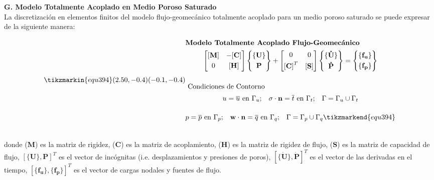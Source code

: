 \textbf{G. Modelo Totalmente Acoplado en Medio Poroso Saturado}\\
La discretización en elementos finitos del modelo flujo-geomecánico totalmente acoplado para un medio poroso saturado se puede expresar de la siguiente manera:

\begin{ceqn} %
\begin{subequations}\label{eq:equ394}
\tikzmarkin{equ394}(2.50,-0.4)(-0.1,-0.4)
\begin{gather}
\shortintertext{\textbf{Modelo Totalmente Acoplado Flujo-Geomecánico}}
\begin{bmatrix}
      \mathbf{[M]}  & \mathbf{-[C]}   \\[0.3em]
      0		   & \mathbf{[H]}       		
\end{bmatrix}
\begin{Bmatrix}
      \{\mathbf{U}\}    \\[0.3em]
      \mathbf{P}      		
\end{Bmatrix}
+
\begin{bmatrix}
      0             & 0           \\[0.3em]
      \mathbf{[C]}^T  & \mathbf{[S]}       		
\end{bmatrix}
\begin{Bmatrix}
      \{\mathbf{\dot{U}}\}    \\[0.3em]
      \mathbf{\dot{P}}      		
\end{Bmatrix}
= 
\begin{Bmatrix}
      \{\mathbf{f_u}\}    \\[0.3em]
      \{\mathbf{f_p}\}      		
\end{Bmatrix} \label{eq:equ394a}\\[12pt]
\shortintertext{   Condiciones de Contorno} 
u = \overline{u}\ \text{en}\ \Gamma_u \text{;}\quad \mathbf{\sigma} \cdot \mathbf{n} = \overline{t}\ \text{en}\ \Gamma_t \text{;}\quad \Gamma = \Gamma_u \cup \Gamma_t \label{eq:equ394b}\\[12pt]
p = \overline{p}\ \text{en}\ \Gamma_p \text{;}\quad  \mathbf{w} \cdot \mathbf{n} = \overline{q}\ \text{en}\ \Gamma_q \text{;}\quad \Gamma = \Gamma_p \cup \Gamma_q \label{eq:equ394c}
\tikzmarkend{equ394}
\end{gather}
\end{subequations}
\end{ceqn}
\\
donde ($\mathbf{M}$) es la matriz de rigidez, ($\mathbf{C}$) es la matriz de acoplamiento, ($\mathbf{H}$) es la matriz de rigidez de flujo, ($\mathbf{S}$) es la matriz de capacidad de flujo, $[\{\mathbf{U}\}, \mathbf{P} ]^T$ es el vector de incógnitas (i.e. desplazamientos y presiones de poros),  $[\{\mathbf{\dot{U}}\},\mathbf{\dot{P}}]^T$ es el vector de las derivadas en el tiempo, $[\{\mathbf{f_u}\}, \{\mathbf{f_p}\}]^T$ es el vector de cargas nodales y fuentes de flujo.\bigskip


